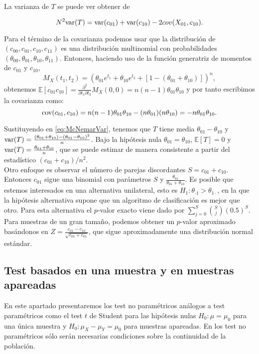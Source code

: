 	La varianza de $T$ se puede ver obtener de 
	
\begin{equation}
	N^2 \text{var}(T) = \text{var}(c_{01}) + \text{var}(c_{10}) - 2 cov(X_{01}, c_{10}).
	\label{eq:McNemarVar}
\end{equation}

	Para el término de la covarianza podemos usar que la 
distribución de $(c_{00}, c_{01}, c_{10}, c_{11})$ es una 
distribución multinomial con probabilidades $(\theta_{00}, 
\theta_{01}, \theta_{10}, \theta_{11})$. Entonces, haciendo 
uso de la función generatriz de momentos de $c_{01}$ y 
$c_{10}$,
	\[ 
		M_X(t_1, t_2) = 
		\left(
			\theta_{01} e^{t_1} + 
			\theta_{10} e^{t_2} + 
			[ 1 - (\theta_{01} + \theta_{10})] \right)^n,
	\]
obtenemos $\mathbb{E}[c_{01}c_{10}] = \frac{\partial^2 }
{\partial t_1 \partial t_2} M_X(0,0) = n(n-1)\theta_{01} 
\theta_{10}$ y por tanto escribimos la covarianza como:
	\[
		\text{cov}( c_{01}, c_{10} ) =
			n (n-1) \theta_{01} \theta_{10} -
			(n \theta_{01}) (n \theta_{10}) = 
			- n \theta_{01} \theta_{10}.
	\]
	
	Sustituyendo en \ref{eq:McNemarVar}, tenemos que $T$ 
tiene media $\theta_{01}-\theta_{10}$ y $\text{var}(T) = 
\frac{(\theta_{01} + \theta_{10}) - (\theta_{01} - 
\theta_{10})^2 }{n}$. Bajo la hipótesis nula $\theta_{01} = 
\theta_{10}$, $\mathbb{E}[T] = 0$ y $\text{var}(T) = \frac{\theta_{01}+
\theta_{10}}{n}$, que se puede estimar de manera consistente 
a partir del estadístico $(c_{01} + c_{10})/n^2$.\\
	Otro enfoque es observar el número de parejas 
discordantes $S = c_{01} + c_{10}$. Entonces $c_{01}$ sigue 
una binomial con parámetros $S$ y $\frac{\theta_{01}}
{\theta_{01}+\theta_{10}}$. Es posible que estemos 
interesados en una alternativa unilateral, esto es $H_1: 
\theta_{\cdot 1} > \theta_{1 \cdot}$, en la que la hipótesis 
alternativa supone que un algoritmo de clasificación es mejor 
que otro. Para esta alternativa el $p$-valor exacto viene 
dado por $\sum\limits_{j=0}^S {S \choose j}(0.5)^S$. Para 
muestras de un gran tamaño, podemos obtener un $p$-valor 
aproximado basándonos en $Z = \frac{c_{01} - c_{10}}
{\sqrt{c_{01} + c_{01}}}$, que sigue aproximadamente una 
distribución normal estándar.
	
\subsection{Test basados en una muestra y en muestras apareadas}
	
	En este apartado presentaremos los test no paramétricos 
análogos a test paramétricos como el test $t$ de Student para 
las hipótesis nulas $H_0: \mu = \mu_0$ para una única muestra 
y $H_0: \mu_X - \mu_Y = \mu_0$ para muestras apareadas. En 
los test no paramétricos sólo serán necesarias condiciones 
sobre la continuidad de la población. 
	
